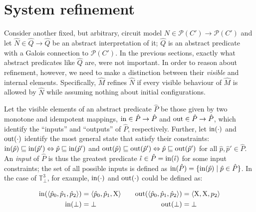 \section{System refinement}

Consider another fixed, but arbitrary, circuit model $N \in \mathcal{P}(C') \rightarrow \mathcal{P}(C')$ and let $\hat N \in \hat Q \rightarrow \hat Q$ be an abstract interpretation of it; $\hat Q$ is an abstract predicate with a Galois connection to $\mathcal{P}(C')$. In the previous sections, exactly what abstract predicates like $\hat Q$ are, were not important. In order to reason about refinement, however, we need to make a distinction between their \textit{visible} and internal elements. Specifically,  $\hat M$ refines $\hat N$ if every visible behaviour of $\hat M$ is allowed by $\hat N$ while assuming nothing about initial configurations.

Let the visible elements of an abstract predicate $\hat P$ be those given by two monotone and idempotent mappings, $\operatorname{in} \in \hat P \rightarrow \hat P$ and $\operatorname{out} \in \hat P \rightarrow \hat P$, which identify the ``inputs'' and ``outputs'' of $\hat P$, respectively. Further, let $\operatorname{in}(\cdot)$ and $\operatorname{out}(\cdot)$ identify the most general state that satisfy their constraints: $\operatorname{in}(\hat p) \sqsubseteq \operatorname{in}(\hat p') \Leftrightarrow \hat p \sqsubseteq \operatorname{in}(\hat p')$ and $\operatorname{out}(\hat p) \sqsubseteq \operatorname{out}(\hat p') \Leftrightarrow \hat p \sqsubseteq \operatorname{out}(\hat p')$ for all $\hat p, \hat p' \in \hat P$. An \textit{input} of $\hat P$ is thus the greatest predicate $\hat \iota \in \hat P = \operatorname{in}(\hat \iota)$ for some input constraints; the set of all possible inputs is defined as $\operatorname{in}(\hat P) = \{ \operatorname{in}(\hat p) \mid \hat p \in \hat P \}$. In the case of $\mathbb{T}_{\bot}^{3}$, for example, $\operatorname{in}(\cdot)$ and $\operatorname{out}(\cdot)$ could be defined as:



\begin{equation*}
\begin{aligned}[t]
\operatorname{in}(\langle \hat p_{0}, \hat p_{1}, \hat p_{2} \rangle) &= \langle \hat p_{0}, \hat p_{1}, \mathrm{X} \rangle \\
\operatorname{in}(\bot) &= \bot
\end{aligned}
\qquad
\begin{aligned}[t]
\operatorname{out}(\langle \hat p_{0}, \hat p_{1}, \hat p_{2} \rangle) &= \langle \mathrm{X}, \mathrm{X}, p_{2} \rangle \\
\operatorname{out}(\bot) &= \bot
\end{aligned}
\end{equation*}


